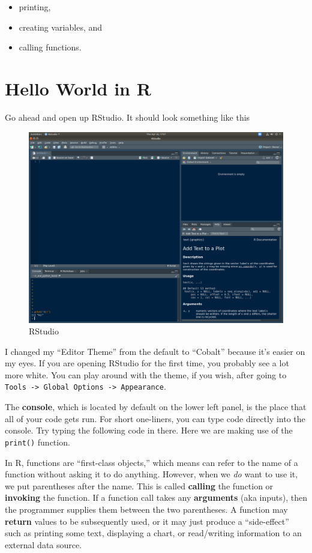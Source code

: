 \documentclass[
  12pt,
]{krantz}
\providecommand{\tightlist}{%
  \setlength{\itemsep}{0pt}\setlength{\parskip}{0pt}}
\begin{document}
\begin{itemize}
\tightlist
\item
  printing,
\item
  creating variables, and
\item
  calling functions.
\end{itemize}

\hypertarget{hello-world-in-r}{%
\section{Hello World in R}\label{hello-world-in-r}}

Go ahead and open up RStudio. It should look something like this

\begin{figure}

{\centering \includegraphics[width=0.8\linewidth]{pics/rstudio} 

}

\caption{RStudio}\label{fig:rstudio}
\end{figure}

I changed my ``Editor Theme'' from the default to ``Cobalt'' because it's easier on my eyes. If you are opening RStudio for the first time, you probably see a lot more white. You can play around with the theme, if you wish, after going to \texttt{Tools\ -\textgreater{}\ Global\ Options\ -\textgreater{}\ Appearance}.

The \textbf{console}, which is located by default on the lower left panel, is the place that all of your code gets run. For short one-liners, you can type code directly into the console. Try typing the following code in there. Here we are making use of the \texttt{print()} function.

In R, functions are ``first-class objects,'' which means can refer to the name of a function without asking it to do anything. However, when we \emph{do} want to use it, we put parentheses after the name. This is called \textbf{calling} the function or \textbf{invoking} the function. If a function call takes any \textbf{arguments} (aka inputs), then the programmer supplies them between the two parentheses. A function may \textbf{return} values to be subsequently used, or it may just produce a ``side-effect'' such as printing some text, displaying a chart, or read/writing information to an external data source.
\end{document}
